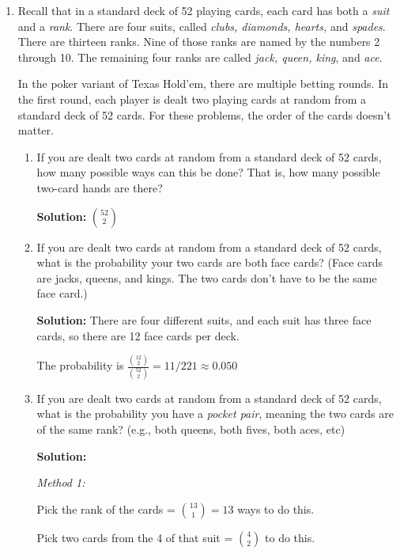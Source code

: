 \documentclass[11pt, letterpaper]{report}
\begin{document}
\begin{enumerate}

\item Recall that in a standard deck of 52 playing cards, each card has both a \emph{suit}
and a \emph{rank}.  There are four suits, called \emph{clubs, diamonds, hearts,} and \emph{spades}.
There are thirteen ranks.  Nine of those ranks are named by the numbers 2 through 10.
The remaining four ranks are called \emph{jack, queen, king}, and \emph{ace}.  


In the poker variant of Texas Hold'em, there are multiple betting rounds.  In the first round, each player is dealt two playing cards at random 
from a standard deck of 52 cards.  For these problems, the order of the cards doesn't matter.
\begin{enumerate}
	     \item If you are dealt two cards at random from a standard deck of 52 cards, how many possible ways can this be done?  That is, how many possible two-card hands
        are there?
        
        \textbf{Solution:} $\binom{52}{2}$
        
        \item If you are dealt two cards at random from a standard deck of 52 cards, what is the probability your two cards are both face cards?  (Face cards are
        jacks, queens, and kings.  The two cards don't have to be the same face card.)
        
        
        \textbf{Solution:} There are four different suits, and each suit has three face cards,
        so there are 12 face cards per deck.
        
        The probability is $\displaystyle \frac{\displaystyle \binom{12}{2}}{\displaystyle \binom{52}{2}} = 11/221
        \approx 0.050$
        
        \item If you are dealt two cards at random from a standard deck of 52 cards, what is the probability you have a \emph{pocket pair}, meaning the two
        cards are of the same rank?  (e.g., both queens, both fives, both aces, etc)
        
                \textbf{Solution:}
        
        \emph{Method 1:}
                
        Pick the rank of the cards = $\binom{13}{1} = 13$ ways to do this.
        
        Pick two cards from the 4 of that suit = $\binom{4}{2}$ to do this.
        

\end{enumerate}
\end{enumerate}
\end{document}
